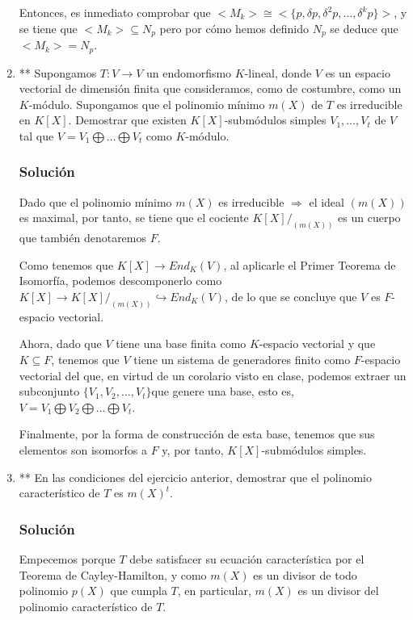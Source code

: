 \documentclass[paper=a4, fontsize=11pt, spanish]{scrartcl}
\begin{document}
\begin{enumerate}
		Entonces, es inmediato comprobar que $ <M_k> \cong <\{p, \delta p, \delta^2 p, \dots, \delta^k p\}>$, y
		se tiene que $<M_k> \subseteq N_p$ pero por cómo hemos definido $N_p$ se deduce que $<M_k> = N_p$.
		
		\item ** Supongamos $T: V \rightarrow V$ un endomorfismo $K$-lineal, donde $V$ es un espacio vectorial de
		dimensión finita que consideramos, como de costumbre, como un $K$-módulo. Supongamos que el polinomio
		mínimo $m(X)$ de $T$ es irreducible en $K[X]$. Demostrar que existen $K[X]$-submódulos simples $V_1, \dots,
		V_t$ de $V$ tal que $V = V_1 \bigoplus \dots \bigoplus V_t$ como $K$-módulo.
		\subsubsection*{Solución}
		Dado que el polinomio mínimo $m(X)$ es irreducible $\Rightarrow$ el ideal $(m(X))$ es maximal, por tanto,
		se tiene que el cociente $K[X]/_{(m(X))}$ es un cuerpo que también denotaremos $F$.
		
		Como tenemos que $K[X] \rightarrow End_K(V)$, al aplicarle el Primer Teorema de Isomorfía, podemos
		descomponerlo como $K[X] \rightarrow K[X]/_{(m(X))} \hookrightarrow End_K(V)$, de lo que se concluye que
		$V$ es $F$-espacio vectorial.
		
		Ahora, dado que $V$ tiene una base finita como $K$-espacio vectorial y que $K \subseteq F$, tenemos que
		$V$ tiene un sistema de generadores finito como $F$-espacio vectorial del que, en virtud de un corolario
		visto en clase, podemos extraer un subconjunto $\{V_1, V_2, \dots, V_t\}$que genere una base, esto es,
		$V = V_1 \bigoplus V_2 \bigoplus \dots \bigoplus V_t$.
		
		Finalmente, por la forma de construcción de esta base, tenemos que sus elementos son isomorfos a $F$ y,
		por tanto, $K[X]$-submódulos simples.
		
		\item ** En las condiciones del ejercicio anterior, demostrar que el polinomio característico de $T$ es
		$m(X)^t$.
		\subsubsection*{Solución}
		Empecemos porque $T$ debe satisfacer su ecuación característica por el Teorema de Cayley-Hamilton, y
		como $m(X)$ es un divisor de todo polinomio $p(X)$ que cumpla $T$, en particular, $m(X)$ es un divisor
		del polinomio característico de $T$.
		

\end{enumerate}
\end{document}
